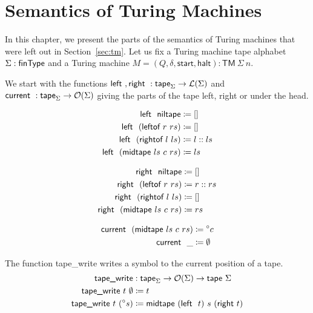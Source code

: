 \chapter{Semantics of Turing Machines}\label{app:TM} 

In this chapter, we present the parts of the semantics of Turing machines that were left out in Section~\ref{sec:tm}. Let us fix a Turing machine tape alphabet $\Sigma :\textsf{finType}$ and a Turing machine $M = (Q, \delta, \textsf{start}, \textsf{halt}) : \textsf{TM}~\Sigma~n$.

We start with the functions $\textsf{left}~, \textsf{right}~: \textsf{tape}_\Sigma \rightarrow \mathcal{L} (\Sigma)$ and $\textsf{current}~: \textsf{tape}_\Sigma \rightarrow \mathcal{O}{(\Sigma)}$ giving the parts of the tape left, right or under the head.

\begin{minipage}{0.5\textwidth}
\begin{align*}
  \textsf{left}~~\textsf{niltape} &\coloneqq [] \\
  \textsf{left}~~(\textsf{leftof}~r~rs) &\coloneqq [] \\
  \textsf{left}~~(\textsf{rightof}~l~ls) &\coloneqq l :: ls \\
  \textsf{left}~~(\textsf{midtape}~ls~c~rs) &\coloneqq ls 
\end{align*}
\end{minipage}
\begin{minipage}{0.5\textwidth}
  \begin{align*}
    \textsf{right}~~\textsf{niltape} &\coloneqq [] \\
    \textsf{right}~~(\textsf{leftof}~r~rs) & \coloneqq r :: rs \\
    \textsf{right}~~(\textsf{rightof}~l~ls) &\coloneqq [] \\
    \textsf{right}~~(\textsf{midtape}~ls~c~rs) &\coloneqq rs
  \end{align*}
\end{minipage}
\begin{align*}
  \textsf{current}~~(\textsf{midtape}~ls~c~rs) &\coloneqq \prescript{\circ}{}c \\
  \textsf{current}~~\_ &\coloneqq \emptyset 
\end{align*}

The function \textsf{tape\_write} writes a symbol to the current position of a tape.
\begin{align*}
  \textsf{tape\_write} &: \textsf{tape}_\Sigma \rightarrow \mathcal{O}{(\Sigma)} \rightarrow \textsf{tape}~\Sigma \\
  \textsf{tape\_write}~t~\emptyset &\coloneqq t \\
  \textsf{tape\_write}~t~(\prescript{\circ}{}s) &\coloneqq \textsf{midtape}~(\textsf{left}~~t)~s~(\textsf{right}~t)
\end{align*}

